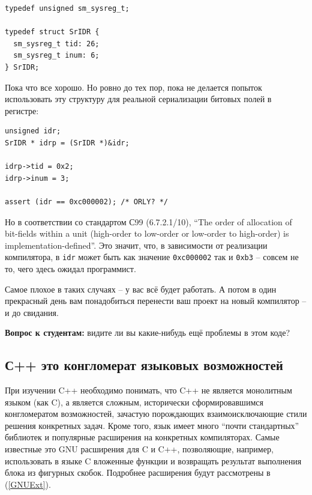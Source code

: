 \documentclass[a4paper,12pt,oneside]{article}
\newif\ifanswers
\begin{document}
\begin{lstlisting}
typedef unsigned sm_sysreg_t;

typedef struct SrIDR {
  sm_sysreg_t tid: 26;
  sm_sysreg_t inum: 6;
} SrIDR;
\end{lstlisting}

Пока что все хорошо. Но ровно до тех пор, пока не делается попыток использовать эту структуру для реальной сериализации битовых полей в регистре:

\begin{lstlisting}
unsigned idr;
SrIDR * idrp = (SrIDR *)&idr;

idrp->tid = 0x2;
idrp->inum = 3;

assert (idr == 0xc000002); /* ORLY? */
\end{lstlisting}

Но в соответствии со стандартом С99 (6.7.2.1/10), ``The order of allocation of bit-fields within a unit (high-order to low-order or low-order to high-order) is implementation-defined''. Это значит, что, в зависимости от реализации компилятора, в \lstinline!idr! может быть как значение \lstinline!0xc000002! так и \lstinline!0xb3! -- совсем не то, чего здесь ожидал программист.

Самое плохое в таких случаях -- у вас всё будет работать. А потом в один прекрасный день вам понадобиться перенести ваш проект на новый компилятор -- и до свидания.

\textbf{Вопрос к студентам:} видите ли вы какие-нибудь ещё проблемы в этом коде?

\ifanswers
Правильный ответ: разумеется тип \lstinline!unsigned! не обязан быть 32-битным. Это также implementation-defined будет ли он таким. Для верности в таких случаях лучше использовать \lstinline!uint32_t!.
\fi

\subsection{С++ это конгломерат языковых возможностей}\label{CppNature}

При изучении C++ необходимо понимать, что C++ не является монолитным языком (как C), а является сложным, исторически сформировавшимся конгломератом возможностей, зачастую порождающих взаимоисключающие стили решения конкретных задач. Кроме того, язык имеет много ``почти стандартных'' библиотек и популярные расширения на конкретных компиляторах. Самые известные это GNU расширения для C и C++, позволяющие, например, использовать в языке C вложенные функции и возвращать результат выполнения блока из фигурных скобок. Подробнее расширения будут рассмотрены в (\ref{GNUExt}).
\end{document}
